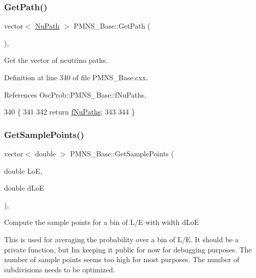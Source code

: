 \subsubsection{\texorpdfstring{Get\+Path()}{GetPath()}}
{\footnotesize\ttfamily vector$<$ \hyperlink{structOscProb_1_1NuPath}{Nu\+Path} $>$ P\+M\+N\+S\+\_\+\+Base\+::\+Get\+Path (\begin{DoxyParamCaption}{ }\end{DoxyParamCaption})\hspace{0.3cm}{\ttfamily [virtual]}, {\ttfamily [inherited]}}

Get the vector of neutrino paths. 

Definition at line 340 of file P\+M\+N\+S\+\_\+\+Base.\+cxx.



References Osc\+Prob\+::\+P\+M\+N\+S\+\_\+\+Base\+::f\+Nu\+Paths.


\begin{DoxyCode}
340                                  \{
341 
342   \textcolor{keywordflow}{return} \hyperlink{classOscProb_1_1PMNS__Base_a69db9d57e12fc7cbe0431bc6c18fac93}{fNuPaths};
343 
344 \}
\end{DoxyCode}
\mbox{\label{classOscProb_1_1PMNS__Base_a9eac8d768c1424755ee41f7e783af179}} 
\subsubsection{\texorpdfstring{Get\+Sample\+Points()}{GetSamplePoints()}}
{\footnotesize\ttfamily vector$<$ double $>$ P\+M\+N\+S\+\_\+\+Base\+::\+Get\+Sample\+Points (\begin{DoxyParamCaption}\item[{double}]{LoE,  }\item[{double}]{d\+LoE }\end{DoxyParamCaption})\hspace{0.3cm}{\ttfamily [virtual]}, {\ttfamily [inherited]}}

Compute the sample points for a bin of L/E with width d\+LoE

This is used for averaging the probability over a bin of L/E. It should be a private function, but I\textquotesingle{}m keeping it public for now for debugging purposes. The number of sample points seems too high for most purposes. The number of subdivisions needs to be optimized.


